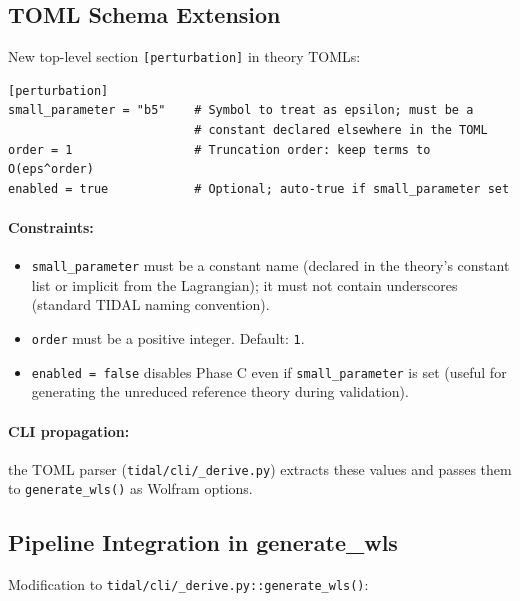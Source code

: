 \subsection{TOML Schema Extension}
\label{sec:prd-toml}

New top-level section \texttt{[perturbation]} in theory TOMLs:

\begin{verbatim}
[perturbation]
small_parameter = "b5"    # Symbol to treat as epsilon; must be a
                          # constant declared elsewhere in the TOML
order = 1                 # Truncation order: keep terms to O(eps^order)
enabled = true            # Optional; auto-true if small_parameter set
\end{verbatim}

\paragraph{Constraints:}
\begin{itemize}
  \item \texttt{small\_parameter} must be a constant name (declared in the theory's constant list or implicit from the Lagrangian); it must not contain underscores (standard TIDAL naming convention).
  \item \texttt{order} must be a positive integer. Default: \texttt{1}.
  \item \texttt{enabled = false} disables Phase C even if \texttt{small\_parameter} is set (useful for generating the unreduced reference theory during validation).
\end{itemize}

\paragraph{CLI propagation:} the TOML parser (\texttt{tidal/cli/\_derive.py}) extracts these values and passes them to \texttt{generate\_wls()} as Wolfram options.

\subsection{Pipeline Integration in generate\_wls}
\label{sec:prd-integration}

Modification to \texttt{tidal/cli/\_derive.py::generate\_wls()}:

